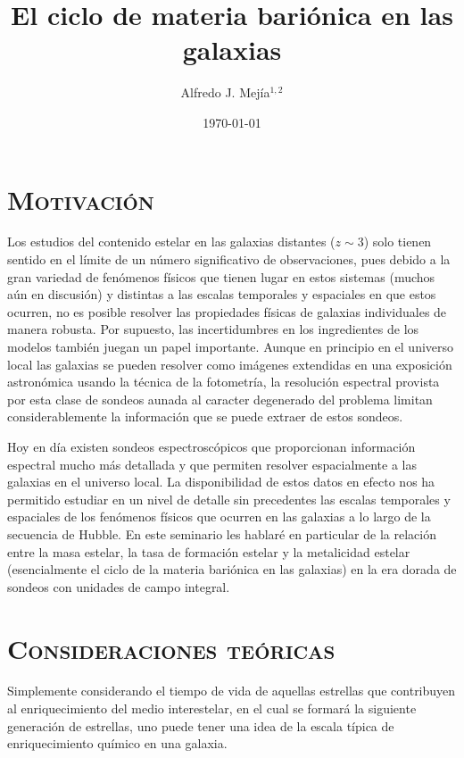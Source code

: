 \documentclass{article}
\begin{document}
\title{El ciclo de materia bariónica en las galaxias}
\author{Alfredo J. Mej\'ia$^{1,2}$}
\date{\today}
\maketitle

\section{\textsc{Motivación}}
%
Los estudios del contenido estelar en las galaxias distantes ($z\sim3$) solo tienen sentido en el
límite de un número significativo de observaciones, pues debido a la gran variedad de fenómenos
físicos que tienen lugar en estos sistemas (muchos aún en discusión) y distintas a las escalas
temporales y espaciales en que estos ocurren, no es posible resolver las propiedades físicas de
galaxias individuales de manera robusta. Por supuesto, las incertidumbres en los ingredientes de los
modelos también juegan un papel importante. Aunque en principio en el universo local las galaxias se
pueden resolver como imágenes extendidas en una exposición astronómica usando la técnica de la
fotometría, la resolución espectral provista por esta clase de sondeos aunada al caracter degenerado
del problema limitan considerablemente la información que se puede extraer de estos sondeos.

Hoy en día existen sondeos espectroscópicos que proporcionan información espectral mucho más
detallada y que permiten resolver espacialmente a las galaxias en el universo local. La
disponibilidad de estos datos en efecto nos ha permitido estudiar en un nivel de detalle sin
precedentes las escalas temporales y espaciales de los fenómenos físicos que ocurren en las galaxias
a lo largo de la secuencia de Hubble. En este seminario les hablaré en particular de la relación
entre la masa estelar, la tasa de formación estelar y la metalicidad estelar (esencialmente el ciclo
de la materia bariónica en las galaxias) en la era dorada de sondeos con unidades de campo integral.
%


\section{\textsc{Consideraciones teóricas}}
%
Simplemente considerando el tiempo de vida de aquellas estrellas que contribuyen al enriquecimiento
del medio interestelar, en el cual se formará la siguiente generación de estrellas, uno puede tener
una idea de la escala típica de enriquecimiento químico en una galaxia.
\end{document}
